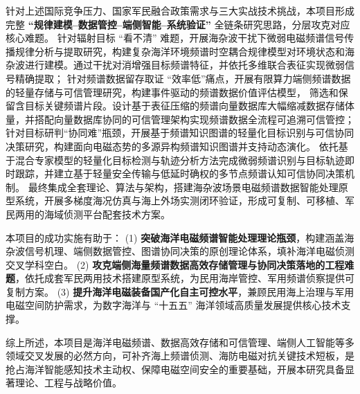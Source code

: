 针对上述国际竞争压力、国家军民融合政策需求与三大实战技术挑战，本项目形成完整\textbf{ “规律建模--数据管控--端侧智能--系统验证” }全链条研究思路，分层攻克对应核心难题。
针对辐射目标 “看不清” 难题，开展海杂波干扰下微弱电磁频谱信号传播规律分析与提取研究，构建复杂海洋环境频谱时空耦合规律模型对环境状态和海杂波进行建模。通过干扰对消增强目标频谱特征，并依托多维联合表征实现微弱信号精确提取；
针对频谱数据留存取证 “效率低”痛点，开展有限算力端侧频谱数据的轻量存储与可信管理研究，构建事件驱动的频谱数据价值评估模型，
筛选和保留含目标关键频谱片段。设计基于表征压缩的频谱向量数据库大幅缩减数据存储体量，并搭配向量数据库协同的可信管理架构实现频谱数据全流程可追溯可信管控；
针对目标研判“协同难”瓶颈，开展基于频谱知识图谱的轻量化目标识别与可信协同决策研究，构建面向电磁态势的多源异构频谱知识图谱并支持动态演化。
依托基于混合专家模型的轻量化目标检测与轨迹分析方法完成微弱频谱识别与目标轨迹即时跟踪，并建立基于轻量安全传输与低延时确权的多节点频谱认知可信协同决策机制。
最终集成全套理论、算法与架构，搭建海杂波场景电磁频谱数据智能处理原型系统，开展多梯度海况仿真与海上外场实测闭环验证，形成可复制、可移植、军民两用的海域侦测平台配套技术方案。

本项目的成功实施有助于：
(1) \textbf{突破海洋电磁频谱智能处理理论瓶颈}，构建涵盖海杂波信号机理、端侧数据管控、图谱协同决策的原创理论体系，填补海洋电磁侦测交叉学科空白。
(2) \textbf{攻克端侧海量频谱数据高效存储管理与协同决策落地的工程难题}，依托成套军民两用技术搭建原型系统，为民用海岸管控、军用频谱侦察提供可复制方案。
(3) \textbf{提升海洋电磁装备国产化自主可控水平}，兼顾民用海上治理与军用电磁空间防护需求，为数字海洋与 “十五五” 海洋领域高质量发展提供核心技术支撑。

综上所述，本项目是海洋电磁频谱、数据高效存储和可信管理、端侧人工智能等多领域交叉发展的必然方向，可补齐海上频谱侦测、海防电磁对抗关键技术短板，是抢占海洋智能感知技术主动权、保障电磁空间安全的重要基础，开展本研究具备显著理论、工程与战略价值。


